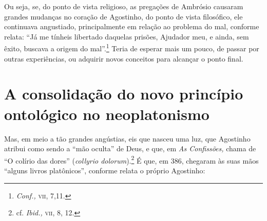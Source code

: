 Ou seja, se, do ponto de vista religioso, as pregações de
Ambrósio causaram grandes mudanças no coração de Agostinho, do
ponto de vista filosófico, ele continuava angustiado,
principalmente em relação ao problema do mal, conforme relata:
“Já me tínheis libertado daquelas prisões, Ajudador meu, e
ainda, sem êxito, buscava a origem do mal”.\footnote{
\emph{Conf.,} \textsc{vii}, 7,11.} Teria de esperar mais um pouco, de
passar por outras experiências, ou adquirir novos conceitos para
alcançar o  ponto final. 

\section{A consolidação do novo princípio ontológico no
neoplatonismo}

Mas, em meio a tão grandes angústias, eis que nasceu uma luz, que
Agostinho atribui como sendo a “mão oculta” de Deus, e que, em
\emph{As Confissões,} chama de “O colírio das dores''
(\emph{collyrio dolorum}).\footnote{ cf. \emph{Ibid.,} \textsc{vii}, 8,
12.}  É que,  em 386, chegaram às suas mãos “alguns
livros platônicos”, conforme relata o próprio  Agostinho: 

